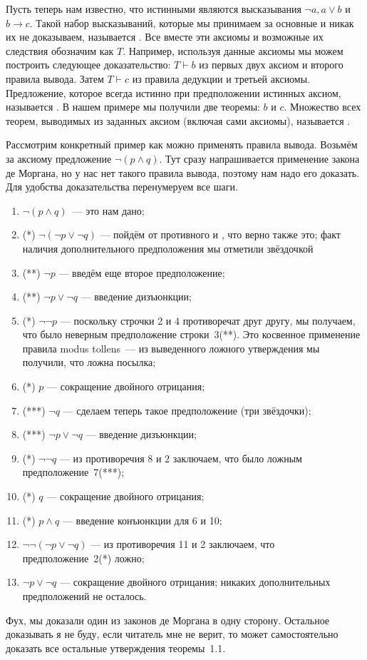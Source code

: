 Пусть теперь нам известно, что истинными являются высказывания $\neg a, a\lor b$ и $b\to c$. Такой набор высказываний, которые мы принимаем за основные и никак их не доказываем, называется . Все вместе эти аксиомы и возможные их следствия обозначим как $T$. Например, используя данные аксиомы мы можем построить следующее доказательство: $T\vdash b$ из первых двух аксиом и второго правила вывода. Затем $T\vdash c$ из правила дедукции и третьей аксиомы. Предложение, которое всегда истинно при предположении истинных аксиом, называется . В нашем примере мы получили две теоремы: $b$ и $c$. Множество всех теорем, выводимых из заданных аксиом (включая сами аксиомы), называется .

\begin{example}
Рассмотрим конкретный пример как можно применять правила вывода. Возьмём за аксиому предложение $\neg (p\land q)$. Тут сразу напрашивается применение закона де Моргана, но у нас нет такого правила вывода, поэтому нам надо его доказать. Для удобства доказательства перенумеруем все шаги.
\begin{enumerate}
\item $\neg (p\land q)$~--- это нам дано;
\item (*) $\neg (\neg p \lor \neg q)$ --- пойдём от противного и , что верно также это; факт наличия дополнительного предположения мы отметили звёздочкой
\item (**) $\neg p$ --- введём еще второе предположение;
\item (**) $\neg p \lor \neg q$ --- введение  дизъюнкции;
\item (*) $\neg \neg p$ --- поскольку строчки 2 и 4 противоречат друг другу, мы получаем, что было неверным предположение строки~3(**). Это косвенное применение правила modus tollens~--- из выведенного ложного утверждения мы получили, что ложна посылка;
\item (*) $p$ --- сокращение двойного отрицания;
\item (***) $\neg q$ --- сделаем теперь такое предположение (три звёздочки);
\item (***) $\neg p \lor \neg q$ --- введение дизъюнкции;
\item (*) $\neg \neg q$ --- из противоречия 8 и 2 заключаем, что было ложным предположение~7(***);
\item (*) $q$ --- сокращение двойного отрицания;
\item (*) $p\land q$ --- введение конъюнкции для 6 и 10;
\item $\neg\neg(\neg p\lor \neg q)$ --- из противоречия 11 и 2 заключаем, что предположение~2(*) ложно;
\item $\neg p\lor \neg q$ --- сокращение двойного отрицания; никаких дополнительных предположений не осталось.
\end{enumerate}
Фух, мы доказали один из законов де Моргана в одну сторону. Остальное доказывать я не буду, если читатель мне не верит, то может самостоятельно доказать все остальные утверждения теоремы~1.1.
\end{example}

